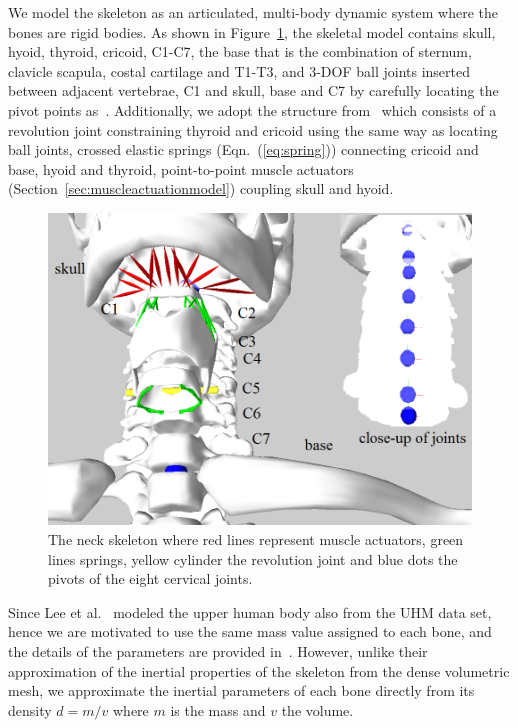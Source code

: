 We model the skeleton as an articulated, multi-body dynamic system where the bones are rigid bodies. As shown in Figure~\ref{fig:neckskeleton}, the skeletal model contains skull, hyoid, thyroid, cricoid, C1-C7, the base that is the combination of sternum, clavicle scapula, costal cartilage and T1-T3, and 3-DOF ball joints inserted between adjacent vertebrae, C1 and skull, base and C7 by carefully locating the pivot points as~\cite{Lee:2006:HUB}. Additionally, we adopt the structure from~\cite{Stavness:2011:CNM} which consists of a revolution joint constraining thyroid and cricoid using the same way as locating ball joints, crossed elastic springs (Eqn.~(\ref{eq:spring})) connecting cricoid and base, hyoid and thyroid, point-to-point muscle actuators (Section~\ref{sec:muscleactuationmodel}) coupling skull and hyoid.
\begin{figure}
\centering
\includegraphics[width=\textwidth]{vriphys/skeletonfinal}
\caption{The neck skeleton where red lines represent muscle actuators, green lines springs, yellow cylinder the revolution joint and blue dots the pivots of the eight cervical joints.}
\label{fig:neckskeleton}
\end{figure}

Since Lee et al.~\cite{Lee:2009:CBM} modeled the upper human body also from the UHM data set, hence we are motivated to use the same mass value assigned to each bone, and the details of the parameters are provided in~\cite{Lee:2008:BMC}. However, unlike their approximation of the inertial properties of the skeleton from the dense volumetric mesh,
we approximate the inertial parameters of each bone directly from its density $d=m/v$ where $m$ is the mass and $v$ the volume.

